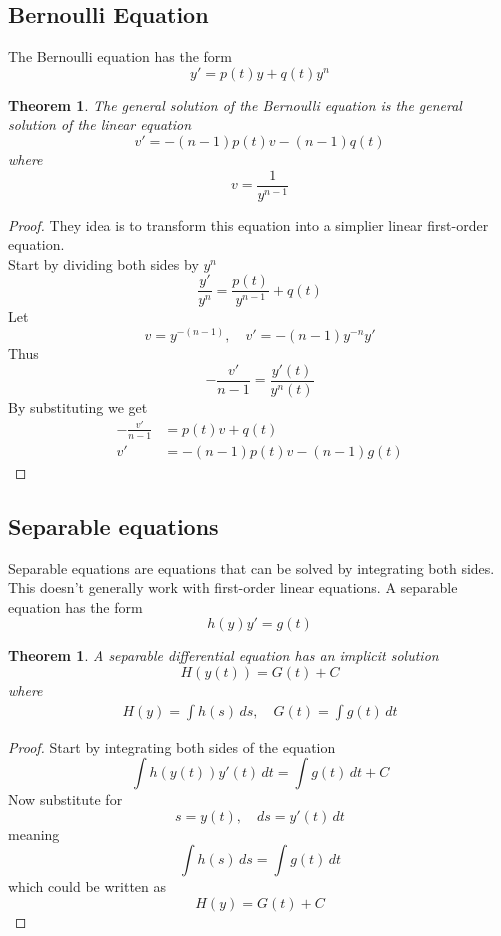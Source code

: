 \documentclass{article}
\newtheorem*{theorem5}{Theorem}
\newtheorem*{theorem6}{Theorem}
\begin{document}
\pagebreak

\subsection{Bernoulli Equation}

The Bernoulli equation has the form
\[
    y' = p(t)y + q(t)y^n
\]

\begin{theorem5}
    The general solution of the Bernoulli equation is the general
    solution of the linear equation
    \[
        v' = -(n-1)p(t)v-(n-1)q(t)
    \]
    where
    \[
        v = \frac{1}{y^{n-1}}
    \]
\end{theorem5}
\begin{proof}
    They idea is to transform this equation into a simplier
    linear first-order equation. \\
    Start by dividing both sides by \(y^n\)
    \[
        \frac{y'}{y^n} = \frac{p(t)}{y^{n-1}} + q(t)
    \]
    Let
    \[
        v = y^{-(n-1)}, 
        \quad
        v' = -(n-1)y^{-n}y'
    \]
    Thus
    \[
        -\frac{v'}{n-1} = \frac{y'(t)}{y^n(t)}
    \]
    By substituting we get
    \begin{align*}
        -\frac{v'}{n-1} &= p(t)v + q(t) \\
        v' &= -(n-1)p(t)v-(n-1)g(t)
    \end{align*}
\end{proof}

\pagebreak

\subsection{Separable equations}

Separable equations are equations that can be solved by integrating both sides.
This doesn't generally work with first-order linear equations.
A separable equation has the form
\[
    h(y)y'=g(t)
\]
\begin{theorem6}
    A separable differential equation has an implicit solution
    \[
        H(y(t)) = G(t) + C
    \]
    where
    \begin{align*}
        H(y) = \int h(s)\,ds
        ,\quad
        G(t) = \int g(t)\,dt
    \end{align*}
\end{theorem6}
\begin{proof}
    Start by integrating both sides of the equation
    \[
        \int h(y(t))y'(t)\,dt =
        \int g(t)\,dt + C
    \]
    Now substitute for
    \[
        s=y(t),
        \quad
        ds=y'(t)\,dt
    \]
    meaning
    \[
        \int h(s)\, ds = 
        \int g(t)\,dt
    \]
    which could be written as
    \[
        H(y) = G(t) + C
    \]
\end{proof}
\end{document}
